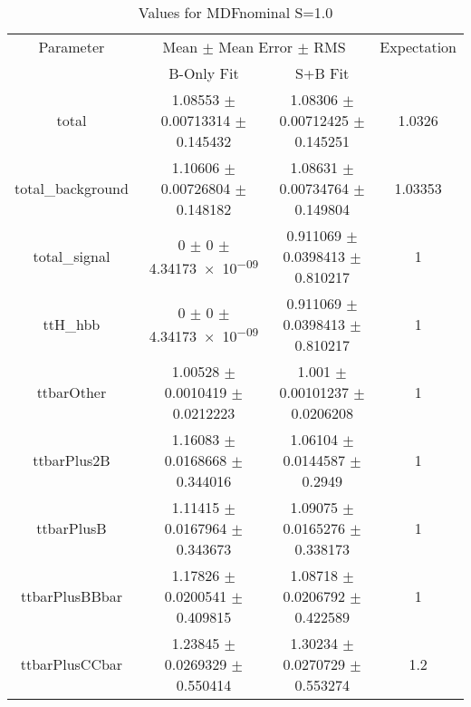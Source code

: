 \begin{table}
\centering
\caption{Values for MDFnominal S=1.0}
\begin{tabular}{cccc}
\toprule
Parameter & \multicolumn{2}{c}{Mean $\pm$ Mean Error $\pm$ RMS} & Expectation\\
 & B-Only Fit & S+B Fit & \\
\midrule
total & \num{1.08553} $\pm$ \num{0.00713314} $\pm$ \num{0.145432} & \num{1.08306} $\pm$ \num{0.00712425} $\pm$ \num{0.145251} & \num{1.0326}\\
total\_background & \num{1.10606} $\pm$ \num{0.00726804} $\pm$ \num{0.148182} & \num{1.08631} $\pm$ \num{0.00734764} $\pm$ \num{0.149804} & \num{1.03353}\\
total\_signal & \num{0} $\pm$ \num{0} $\pm$ \num{4.34173e-09} & \num{0.911069} $\pm$ \num{0.0398413} $\pm$ \num{0.810217} & \num{1}\\
ttH\_hbb & \num{0} $\pm$ \num{0} $\pm$ \num{4.34173e-09} & \num{0.911069} $\pm$ \num{0.0398413} $\pm$ \num{0.810217} & \num{1}\\
ttbarOther & \num{1.00528} $\pm$ \num{0.0010419} $\pm$ \num{0.0212223} & \num{1.001} $\pm$ \num{0.00101237} $\pm$ \num{0.0206208} & \num{1}\\
ttbarPlus2B & \num{1.16083} $\pm$ \num{0.0168668} $\pm$ \num{0.344016} & \num{1.06104} $\pm$ \num{0.0144587} $\pm$ \num{0.2949} & \num{1}\\
ttbarPlusB & \num{1.11415} $\pm$ \num{0.0167964} $\pm$ \num{0.343673} & \num{1.09075} $\pm$ \num{0.0165276} $\pm$ \num{0.338173} & \num{1}\\
ttbarPlusBBbar & \num{1.17826} $\pm$ \num{0.0200541} $\pm$ \num{0.409815} & \num{1.08718} $\pm$ \num{0.0206792} $\pm$ \num{0.422589} & \num{1}\\
ttbarPlusCCbar & \num{1.23845} $\pm$ \num{0.0269329} $\pm$ \num{0.550414} & \num{1.30234} $\pm$ \num{0.0270729} $\pm$ \num{0.553274} & \num{1.2}\\
\bottomrule
\end{tabular}
\end{table}